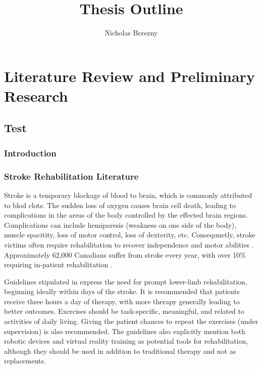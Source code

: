 \documentclass[12pt]{report}
\author{Nicholas Berezny}
\title{Thesis Outline}
\begin{document}
\maketitle
\newpage

\chapter{Literature Review and Preliminary Research}
\section{Test}

	\subsection{Introduction}

	\subsection{Stroke Rehabilitation Literature}
%

Stroke is a temporary blockage of blood to brain, which is commonly attributed to blod clots. The sudden loss of oxygen causes brain cell death, leading to complications in the areas of the body controlled by the effected brain regions. Complications can include hemiparesis (weakness on one side of the body), muscle spacitity, loss of motor control, loss of dexterity, etc. Consequnetly, stroke victims often require rehabilitation to recover independence and motor abilities \cite{Stroke}. Approximately 62,000 Canadians suffer from stroke every year, with over 10\% requiring in-patient rehabilitation \cite{Hebert2016}. 

Guidelines stipulated in \cite{Hebert2016} express the need for prompt lower-limb rehabilitation, beginning ideally within days of the stroke. It is recommended that patients receive three hours a day of therapy, with more therapy generally leading to better outcomes. Exercises should be task-specific, meaningful, and related to activities of daily living. Giving the patient chances to repeat the exercises (under supervision) is also recommended.  The guidelines also explicitly mention both robotic devices and virtual reality training as potential tools for rehabilitation, although they should be used in addition to traditional therapy and not as replacements.  
\end{document}
